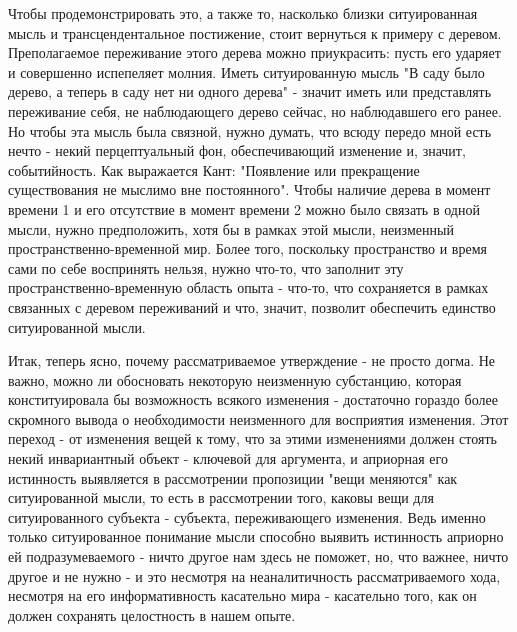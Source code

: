 \documentclass{article}
\begin{document}
Чтобы продемонстрировать это, а также то, насколько близки ситуированная мысль и трансцендентальное постижение, стоит вернуться к примеру с деревом. Преполагаемое переживание этого дерева можно приукрасить: пусть его ударяет и совершенно испепеляет молния. Иметь ситуированную мысль "В саду было дерево, а теперь в саду нет ни одного дерева" - значит иметь или представлять переживание себя, не наблюдающего дерево сейчас, но наблюдавшего его ранее. Но чтобы эта мысль была связной, нужно думать, что всюду передо мной есть нечто - некий перцептуальный фон, обеспечивающий изменение и, значит, событийность. Как выражается Кант: "Появление или прекращение существования не мыслимо вне постоянного". Чтобы наличие дерева в момент времени 1 и его отсутствие в момент времени 2 можно было связать в одной мысли, нужно предположить, хотя бы в рамках этой мысли, неизменный пространственно-временной мир. Более того, поскольку пространство и время сами по себе воспринять нельзя, нужно что-то, что заполнит эту пространственно-временную область опыта - что-то, что сохраняется в рамках связанных с деревом переживаний и что, значит, позволит обеспечить единство ситуированной мысли.

Итак, теперь ясно, почему рассматриваемое утверждение - не просто догма. Не важно, можно ли обосновать некоторую неизменную субстанцию, которая конституировала бы возможность всякого изменения - достаточно гораздо более скромного вывода о необходимости неизменного для восприятия изменения. Этот переход - от изменения вещей к тому, что за этими изменениями должен стоять некий инвариантный объект - ключевой для аргумента, и априорная его истинность выявляется в рассмотрении пропозиции "вещи меняются" как ситуированной мысли, то есть в рассмотрении того, каковы вещи для ситуированного субъекта - субъекта, переживающего изменения. Ведь именно только ситуированное понимание мысли способно выявить истинность априорно ей подразумеваемого - ничто другое нам здесь не поможет, но, что важнее, ничто другое и не нужно - и это несмотря на неаналитичность рассматриваемого хода, несмотря на его информативность касательно мира - касательно того, как он должен сохранять целостность в нашем опыте.
\end{document}
